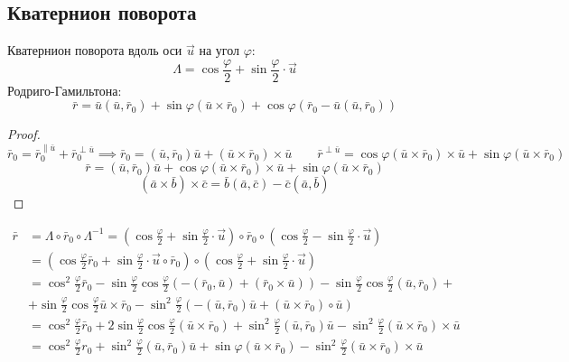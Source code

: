 \documentclass[crop=false]{standalone}
\begin{document}
\subsection{Кватернион поворота}
Кватернион поворота вдоль оси $\vec u$ на угол $\varphi$:
\[\Lambda = \cos \frac{\varphi}{2} + \sin \frac{\varphi}{2} \cdot \vec u\]
 Родриго-Гамильтона:
\[\boxed{\bar r= \bar u (\bar u , \bar r_0) + \sin \varphi (\bar u \times \bar r_0) + \cos \varphi (\bar r_0 - \bar u (\bar u, \bar r_0))}\]
\begin{proof}
\[\bar r_0 = \bar r_0^{\| \bar u} + \bar r_0^{\perp \bar u} \implies \bar r_0 = (\bar u ,\bar r_0) \bar u + (\bar u \times \bar r_0 ) \times \bar u \qquad \bar r^{\perp \bar u} = \cos \varphi (\bar u \times \bar r_0) \times \bar u + \sin \varphi (\bar u \times \bar r_0)\]
\[\bar r = (\bar u, \bar r_0) \bar u + \cos \varphi (\bar u \times \bar r_0) \times \bar u + \sin \varphi (\bar u \times \bar r_0) \]
\[(\bar a\times \bar b) \times \bar c = \bar b (\bar a , \bar c) - \bar c ( \bar a , \bar b)\]   
\end{proof}
\[\begin{aligned}
    \bar r &= \Lambda \circ \bar r_0 \circ \Lambda^{-1} = (\cos \frac{\varphi}{2} + \sin \frac{\varphi}{2} \cdot \vec u) \circ \bar r_0 \circ (\cos \frac{\varphi}{2} - \sin \frac{\varphi}{2} \cdot \vec u) \\
    &= \left( \cos \frac{\varphi}{2} \bar r_0 + \sin \frac{\varphi}{2} \cdot \vec u \circ \bar r_0\right) \circ \left( \cos \frac{\varphi}{2} + \sin \frac{\varphi}{2} \cdot \vec u \right) \\
    &= \cos^2 \frac{\varphi}{2} \bar r_0 - \sin \frac{\varphi}{2} \cos \frac{\varphi}{2} ( - (\bar r_0 , \bar u) + (\bar r_0 \times \bar u)) - \sin \frac{\varphi}{2} \cos \frac{\varphi}{2} (\bar u, \bar r_0)+  \\
    &+ \sin \frac{\varphi}{2} \cos \frac{\varphi}{2} \bar u \times \bar r_0 - \sin^2 \frac{\varphi}{2} ( - (\bar u , \bar r_0) \bar u+  (\bar u \times \bar r_0) \circ \bar u) \\
    &= \cos^2 \frac{\varphi}{2} \bar r_0 + 2 \sin \frac{\varphi}{2} \cos \frac{\varphi}{2} (\bar u \times \bar r_0) + \sin^2 \frac{\varphi}{2}(\bar u , \bar r_0) \bar u - \sin^2 \frac{\varphi}{2} (\bar u \times \bar r_0) \times \bar u \\
    &= \cos^2 \frac{\varphi}{2} r_0 + \sin^2 \frac{\varphi}{2} (\bar u , \bar r_0) \bar u + \sin \varphi (\bar u \times \bar r_0) - \sin^2 \frac{\varphi}{2} (\bar u \times \bar r_0) \times \bar u
 \end{aligned}
    \]
\end{document}
